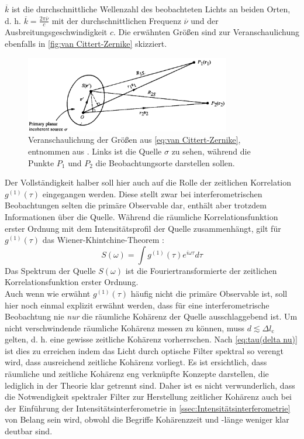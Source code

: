 $\overline{k}$ ist die durchschnittliche Wellenzahl des beobachteten Lichts an beiden Orten, d. h. $\overline{k} = \frac{2\pi\overline{\nu}}{c}$ mit der durchschnittlichen Frequenz $\overline{\nu}$ und der Ausbreitungsgeschwindigkeit $c$. 
Die erwähnten Größen sind zur Veranschaulichung ebenfalls in \autoref{fig:van Cittert-Zernike} skizziert. \\
\begin{figure}[h]
    \centering
    \includegraphics[width=0.8\textwidth]{images/Theorie/Mandel_4.12.png}
    \caption{Veranschaulichung der Größen aus \autoref{eq:van Cittert-Zernike}, entnommen aus \cite[Abb. 4.12]{mandelOpticalCoherenceQuantum1995}. Links ist die Quelle $\sigma$ zu sehen, während die Punkte $P_1$ und $P_2$ die Beobachtungsorte darstellen sollen. }
    \label{fig:van Cittert-Zernike}
\end{figure}
Der Vollständigkeit halber soll hier auch auf die Rolle der zeitlichen Korrelation $g^{(1)}(\tau)$ eingegangen werden. 
Diese stellt zwar bei interferometrischen Beobachtungen selten die primäre Observable dar, enthält aber trotzdem Informationen über die Quelle. 
Während die räumliche Korrelationsfunktion erster Ordnung mit dem Intensitätsprofil der Quelle zusammenhängt, gilt für $g^{(1)}(\tau)$ das Wiener-Khintchine-Theorem \cite{lasseguesFieldIntensityCorrelations2022}:
\begin{equation}
    S(\omega) =  \int g^{(1)}(\tau) e^{i\omega\tau} d\tau
\end{equation}
Das Spektrum der Quelle $S(\omega)$ ist die Fouriertransformierte der zeitlichen Korrelationsfunktion erster Ordnung. \\
Auch wenn wie erwähnt $g^{(1)}(\tau)$ häufig nicht die primäre Observable ist, soll hier noch einmal explizit erwähnt werden, dass für eine interferometrische Beobachtung nie \emph{nur} die räumliche Kohärenz der Quelle ausschlaggebend ist. 
Um nicht verschwindende räumliche Kohärenz messen zu können, muss $d\lesssim \Delta l_\mathrm{c}$ gelten, d. h. eine gewisse zeitliche Kohärenz vorherrschen. 
Nach \autoref{eq:tau(delta nu)} ist dies zu erreichen indem das Licht durch optische Filter spektral so verengt wird, dass ausreichend zeitliche Kohärenz vorliegt. 
Es ist ersichtlich, dass räumliche und zeitliche Kohärenz eng verknüpfte Konzepte darstellen, die lediglich in der Theorie klar getrennt sind. 
Daher ist es nicht verwunderlich, dass die Notwendigkeit spektraler Filter zur Herstellung zeitlicher Kohärenz auch bei der Einführung der Intensitätsinterferometrie in \autoref{ssec:Intensitätsinterferometrie} von Belang sein wird, obwohl die Begriffe Kohärenzzeit und -länge weniger klar deutbar sind. \\

